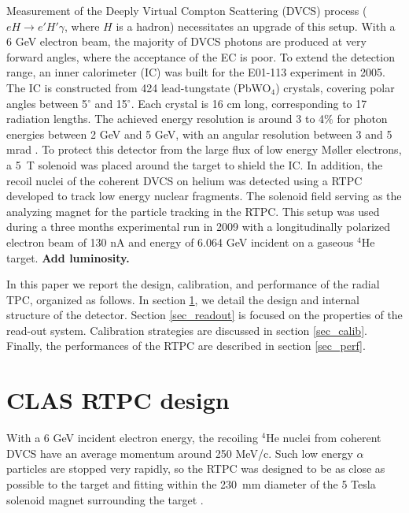 \documentclass[twocolumn,showpacs,superscriptaddress,groupedaddress]{revtex4}
\begin{document}
Measurement of the Deeply Virtual Compton Scattering (DVCS) process
($eH \rightarrow e' H' \gamma$, where $H$ is a hadron) necessitates an upgrade
of this setup.  With a 6 GeV electron beam, the majority of DVCS photons are produced
at very forward angles, where the acceptance of the EC is poor. To extend the detection range,
an inner calorimeter (IC) was built for the E01-113 experiment in 2005.
The IC is constructed from 424 lead-tungstate (PbWO$_{4}$) crystals, covering polar 
angles between 5$^{\circ}$ and 15$^{\circ}$. Each crystal is 16 cm long, corresponding
to 17 radiation lengths. The achieved energy resolution is around 3 to 4$\%$ for photon
energies between 2 GeV and 5 GeV, with an angular resolution between 3 and 5 mrad 
\cite{Hyon-suk}. To protect this detector from the large flux of low energy M{\o}ller 
electrons, a 5~T solenoid was placed around the target to shield the IC. 
In addition, the recoil nuclei of the coherent DVCS on helium was detected 
using a RTPC developed to track low energy nuclear fragments. The solenoid field
serving as the analyzing magnet for the particle tracking in the RTPC. This 
setup was used during a three months experimental run
in 2009 with a longitudinally polarized electron beam of 130 nA 
and energy of 6.064 GeV incident on a gaseous $^{4}$He target.
{\bf \color{red} Add luminosity.}

In this paper we report the design, calibration, and performance of the radial 
TPC, organized as follows. In section \ref{sec_design}, we detail the design 
and internal structure of the detector. Section \ref{sec_readout} is focused 
on the properties of the read-out system. Calibration 
strategies are discussed in section \ref{sec_calib}. Finally, the performances
of the RTPC are described in section \ref{sec_perf}.

\section{CLAS RTPC design} \label{sec_design}

With a 6 GeV incident electron energy, the recoiling $^{4}$He nuclei from coherent 
DVCS have an average momentum around 250 MeV/c. Such low energy $\alpha$ 
particles are stopped very rapidly, so the RTPC was designed to be as close 
as possible to the target and fitting within the 230~mm diameter 
of the 5 Tesla solenoid magnet surrounding the target \cite{Hyon-suk}. 
\end{document}
